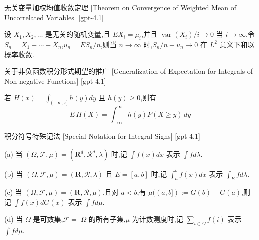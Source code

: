 \documentclass[UTF8]{ctexart}
\begin{document}
    
    
    \begin{thm}
        {无关变量加权均值收敛定理}
        [Theorem on Convergence of Weighted Mean of Uncorrelated Variables]
        [gpt-4.1]
        
设 $X_{1}, X_{2}, \dots$ 是无关的随机变量,且 $E X_{i} = \mu_{i}$,并且 $\operatorname{var}(X_{i}) / i \to 0$ 当 $i \to \infty$.令 $S_{n} = X_{1} + \cdots + X_{n}$,$
u_{n} = E S_{n} / n$,则当 $n \to \infty$ 时,$S_{n} / n - 
u_{n} \to 0$ 在 $L^{2}$ 意义下和以概率收敛.

    \end{thm}
    
    
    
    \begin{lma}
        {关于非负函数积分形式期望的推广}
        [Generalization of Expectation for Integrals of Non-negative Functions]
        [gpt-4.1]
        
若 $H(x) = \int_{(-\infty, x]} h(y) dy$ 且 $h(y) \geq 0$,则有
\[
E\, H(X) = \int_{-\infty}^{\infty} h(y) P(X \geq y)\, dy
\]

    \end{lma}
    
    
    
    \begin{dfn}
        {积分符号特殊记法}
        [Special Notation for Integral Signs]
        [gpt-4.1]
        
(a) 当 $( \Omega , { \mathcal F } , \mu ) = ( { \mathbf R } ^ { d } , { \mathcal R } ^ { d } , \lambda )$ 时,记 $\int f ( x ) d x$ 表示 $\int f d \lambda$.

(b) 当 $( \Omega , \mathcal{F} , \mu ) = ( \mathbf{R} , \mathcal{R} , \lambda )$ 且 $E = [ a , b ]$ 时,记 $\int_{a}^{b} f ( x ) d x$ 表示 $\int_{E} f d \lambda$.

(c) 当 $( \Omega , { \mathcal F } , \mu ) = ( \mathbf{R} , { \mathcal R } , \mu )$,且对 $a < b$,有 $\mu ( ( a , b ] ) := G ( b ) - G ( a )$,则记 $\int f ( x ) d G ( x )$ 表示 $\int f d \mu$.

(d) 当 $\Omega$ 是可数集,${ \mathcal F } =$ $\Omega$ 的所有子集,$\mu$ 为计数测度时,记 $\sum_{i \in \Omega} f(i)$ 表示 $\int f d \mu$.

    \end{dfn}
    
\end{document}
